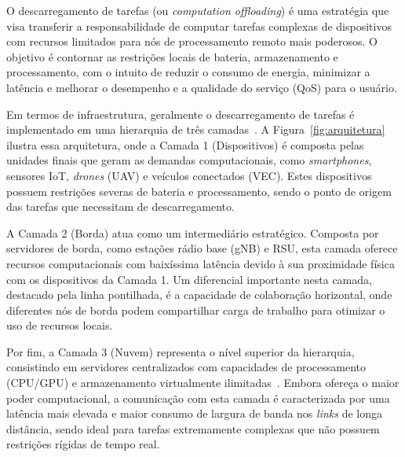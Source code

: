 
O descarregamento de tarefas (ou \textit{computation offloading}) é uma estratégia que visa transferir a responsabilidade de computar tarefas complexas de dispositivos com recursos limitados para nós de processamento remoto mais poderosos. O objetivo é contornar as restrições locais de bateria, armazenamento e processamento, com o intuito de reduzir o consumo de energia, minimizar a latência e melhorar o desempenho e a qualidade do serviço (\gls{QoS}) para o usuário.



Em termos de infraestrutura, geralmente o descarregamento de tarefas é implementado em uma hierarquia de três camadas~\cite{Multimedia2022, FutureInternet2023}. A Figura~\ref{fig:arquitetura} ilustra essa arquitetura, onde a Camada 1 (Dispositivos) é composta pelas unidades finais que geram as demandas computacionais, como \textit{smartphones}, sensores \gls{IoT}, \textit{drones} (\gls{UAV}) e veículos conectados (\gls{VEC}). Estes dispositivos possuem restrições severas de bateria e processamento, sendo o ponto de origem das tarefas que necessitam de descarregamento.

A Camada 2 (Borda) atua como um intermediário estratégico. Composta por servidores de borda, como estações rádio base (\gls{gNB}) e \gls{RSU}, esta camada oferece recursos computacionais com baixíssima latência devido à sua proximidade física com os dispositivos da Camada 1. Um diferencial importante nesta camada, destacado pela linha pontilhada, é a capacidade de colaboração horizontal, onde diferentes nós de borda podem compartilhar carga de trabalho para otimizar o uso de recursos locais.

Por fim, a Camada 3 (Nuvem) representa o nível superior da hierarquia, consistindo em servidores centralizados com capacidades de processamento (\gls{CPU}/\gls{GPU}) e armazenamento virtualmente ilimitadas~\cite{ReferenceArch2022}. Embora ofereça o maior poder computacional, a comunicação com esta camada é caracterizada por uma latência mais elevada e maior consumo de largura de banda nos \textit{links} de longa distância, sendo ideal para tarefas extremamente complexas que não possuem restrições rígidas de tempo real.


